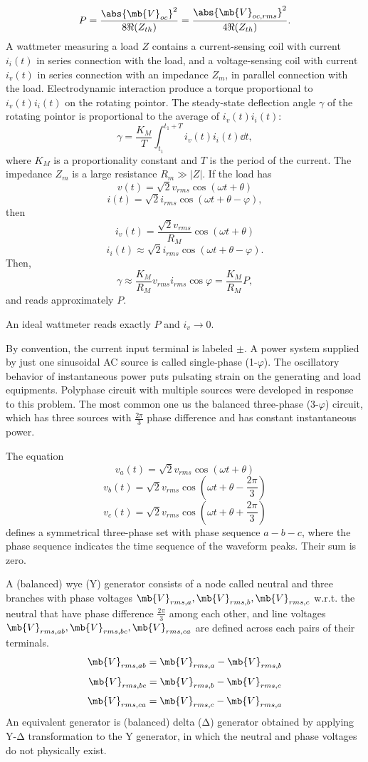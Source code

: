 \documentclass[a4paper,12pt]{article}
\begin{document}
\[P=\frac{\abs{\mb{V}_{oc}}^2}{8\Re(Z_{th})}=\frac{\abs{\mb{V}_{oc,rms}}^2}{4\Re(Z_{th})}.\]
A wattmeter measuring a load $Z$ contains a current-sensing coil with current $i_i(t)$ in series connection with the load, and a voltage-sensing coil with current $i_v(t)$ in series connection with an impedance $Z_m$, in parallel connection with the load. Electrodynamic interaction produce a torque proportional to $i_v(t)i_i(t)$ on the rotating pointor. The steady-state deflection angle $\gamma$ of the rotating pointor is proportional to the average of $i_v(t)i_i(t)$:
\[\gamma=\frac{K_M}{T}\int_{t_1}^{t_1+T}i_v(t)i_i(t)\dd{t},\]
where $K_M$ is a proportionality constant and $T$ is the period of the current. The impedance $Z_m$ is a large resistance $R_m\gg|Z|$. If the load has
\[v(t)=\sqrt{2}v_{rms}\cos(\omega t+\theta)\]
\[i(t)=\sqrt{2}i_{rms}\cos(\omega t+\theta-\varphi),\]
then
\[i_v(t)=\frac{\sqrt{2}v_{rms}}{R_M}\cos(\omega t+\theta)\]
\[i_i(t)\approx\sqrt{2}i_{rms}\cos(\omega t+\theta-\varphi).\]
Then,
\[\gamma\approx\frac{K_M}{R_M}v_{rms}i_{rms}\cos\varphi=\frac{K_M}{R_M}P,\]
and reads approximately $P$.

An ideal wattmeter reads exactly $P$ and $i_v\to0$.

By convention, the current input terminal is labeled $\pm$.
A power system supplied by just one sinusoidal AC source is called single-phase (1-$\varphi$). The oscillatory behavior of instantaneous power puts pulsating strain on the generating and load equipments. Polyphase circuit with multiple sources were developed in response to this problem. The most common one us the balanced three-phase (3-$\varphi$) circuit, which has three sources with $\frac{2\pi}{3}$ phase difference and has constant instantaneous power.

The equation
\[v_a(t)=\sqrt{2}v_{rms}\cos(\omega t+\theta)\]
\[v_b(t)=\sqrt{2}v_{rms}\cos(\omega t+\theta-\frac{2\pi}{3})\]
\[v_c(t)=\sqrt{2}v_{rms}\cos(\omega t+\theta+\frac{2\pi}{3})\]
defines a symmetrical three-phase set with phase sequence $a-b-c$, where the phase sequence indicates the time sequence of the waveform peaks. Their sum is zero.

A (balanced) wye (Y) generator consists of a node called neutral and three branches with phase voltages $\mb{V}_{rms,a},\mb{V}_{rms,b},\mb{V}_{rms,c}$ w.r.t. the neutral that have phase difference $\frac{2\pi}{3}$ among each other, and line voltages $\mb{V}_{rms,ab},\mb{V}_{rms,bc},\mb{V}_{rms,ca}$ are defined across each pairs of their terminals.
\[\mb{V}_{rms,ab}=\mb{V}_{rms,a}-\mb{V}_{rms,b}\]
\[\mb{V}_{rms,bc}=\mb{V}_{rms,b}-\mb{V}_{rms,c}\]
\[\mb{V}_{rms,ca}=\mb{V}_{rms,c}-\mb{V}_{rms,a}\]
An equivalent generator is (balanced) delta (Δ) generator obtained by applying Y-Δ transformation to the Y generator, in which the neutral and phase voltages do not physically exist.
\end{document}
